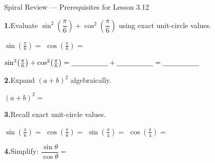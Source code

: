 \documentclass[10pt]{article}
\begin{document}
\namedateperiod

\vspace{0.10in}

\begin{notesbox}{Spiral Review --- Prerequisites for Lesson 3.12}

\textbf{1.}\quad Evaluate $\sin^2\!\left(\dfrac{\pi}{6}\right) + \cos^2\!\left(\dfrac{\pi}{6}\right)$
using exact unit-circle values.

\vspace{4pt}
$\sin\!\left(\tfrac{\pi}{6}\right) = $ \blank{1.8cm}\quad
$\cos\!\left(\tfrac{\pi}{6}\right) = $ \blank{1.8cm}

\vspace{6pt}
$\sin^2\!\left(\tfrac{\pi}{6}\right) + \cos^2\!\left(\tfrac{\pi}{6}\right)
= \blank{1.8cm} + \blank{1.8cm} = \blank{1.8cm}$

\vspace{0.14in}
\textbf{2.}\quad Expand $(a + b)^2$ algebraically.

\vspace{4pt}
$(a + b)^2 = $ \blank{6cm}

\vspace{0.14in}
\textbf{3.}\quad Recall exact unit-circle values.

\vspace{4pt}
$\sin\!\left(\tfrac{\pi}{6}\right) = $ \blank{1.6cm}\hspace{0.6cm}
$\cos\!\left(\tfrac{\pi}{6}\right) = $ \blank{1.6cm}\hspace{0.6cm}
$\sin\!\left(\tfrac{\pi}{4}\right) = $ \blank{1.6cm}\hspace{0.6cm}
$\cos\!\left(\tfrac{\pi}{4}\right) = $ \blank{1.6cm}

\vspace{0.14in}
\textbf{4.}\quad Simplify: $\dfrac{\sin\theta}{\cos\theta} = $ \blank{2.5cm}

\end{notesbox}
\end{document}
